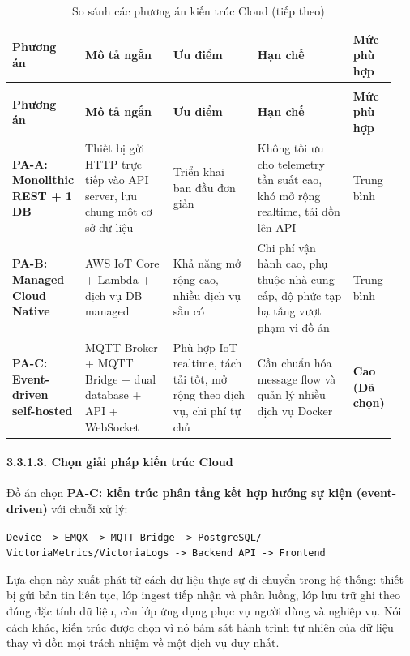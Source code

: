 \documentclass[a4paper]{extarticle}
\newcommand{\thesissettableid}[2]{%
  \renewcommand{\thetable}{#1}%
  \renewcommand{\theHtable}{#2}%
}
\begin{document}
{\thesissettableid{3.15A}{tab-ch3-so-sanh-cac-phuong-an-kien-truc-cloud}
\def\LTcaptype{table}
\begin{longtable}{|L{0.145\linewidth}|L{0.230\linewidth}|L{0.220\linewidth}|L{0.250\linewidth}|L{0.100\linewidth}|}
\caption{So sánh các phương án kiến trúc Cloud}\label{tab:ch3-so-sanh-cac-phuong-an-kien-truc-cloud}\\
\hline \textbf{Phương án} & \textbf{Mô tả ngắn} & \textbf{Ưu điểm} & \textbf{Hạn chế} & \textbf{Mức phù hợp} \\
\hline
\endfirsthead
\caption[]{So sánh các phương án kiến trúc Cloud (tiếp theo)}\\
\hline \textbf{Phương án} & \textbf{Mô tả ngắn} & \textbf{Ưu điểm} & \textbf{Hạn chế} & \textbf{Mức phù hợp} \\
\hline
\endhead
\hline
\endfoot
\endlastfoot
\textbf{PA-A: Monolithic REST + 1 DB} & Thiết bị gửi HTTP trực tiếp vào
API server, lưu chung một cơ sở dữ liệu & Triển khai ban đầu đơn giản &
Không tối ưu cho telemetry tần suất cao, khó mở rộng realtime, tải dồn
lên API & Trung bình \\\hline
\textbf{PA-B: Managed Cloud Native} & AWS IoT Core + Lambda + dịch vụ DB
managed & Khả năng mở rộng cao, nhiều dịch vụ sẵn có & Chi phí vận hành
cao, phụ thuộc nhà cung cấp, độ phức tạp hạ tầng vượt phạm vi đồ án &
Trung bình \\\hline
\textbf{PA-C: Event-driven self-hosted} & MQTT Broker + MQTT Bridge +
dual database + API + WebSocket & Phù hợp IoT realtime, tách tải tốt, mở
rộng theo dịch vụ, chi phí tự chủ & Cần chuẩn hóa message flow và quản
lý nhiều dịch vụ Docker & \textbf{Cao (Đã chọn)} \\\hline
\end{longtable}
}


\paragraph{3.3.1.3. Chọn giải pháp kiến trúc
Cloud}\label{3133-chux1ecdn-giux1ea3i-phuxe1p-kiux1ebfn-truxfac-cloud}

Đồ án chọn \textbf{PA-C: kiến trúc phân tầng kết hợp hướng sự kiện
(event-driven)} với chuỗi xử lý:

\texttt{Device\ -\textgreater{}\ EMQX\ -\textgreater{}\ MQTT\ Bridge\ -\textgreater{}\ PostgreSQL/}\\
\texttt{VictoriaMetrics/VictoriaLogs\ -\textgreater{}\ Backend\ API\ -\textgreater{}\ Frontend}

Lựa chọn này xuất phát từ cách dữ liệu thực sự di chuyển trong hệ thống:
thiết bị gửi bản tin liên tục, lớp ingest tiếp nhận và phân luồng, lớp
lưu trữ ghi theo đúng đặc tính dữ liệu, còn lớp ứng dụng phục vụ người
dùng và nghiệp vụ. Nói cách khác, kiến trúc được chọn vì nó bám sát
hành trình tự nhiên của dữ liệu thay vì dồn mọi trách nhiệm về một dịch
vụ duy nhất.
\end{document}
